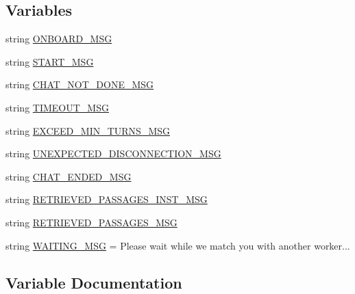 \subsection*{Variables}
\begin{DoxyCompactItemize}
\item 
string \hyperlink{namespacepersonachat__eval_1_1worlds_abc88de34626a01543ac942d5fce1efa5}{O\+N\+B\+O\+A\+R\+D\+\_\+\+M\+SG}
\item 
string \hyperlink{namespacepersonachat__eval_1_1worlds_ad32547472d0fc805d4fea6848b2bb998}{S\+T\+A\+R\+T\+\_\+\+M\+SG}
\item 
string \hyperlink{namespacepersonachat__eval_1_1worlds_accdb0ecc5e13a680dd0a04bc50ec58f4}{C\+H\+A\+T\+\_\+\+N\+O\+T\+\_\+\+D\+O\+N\+E\+\_\+\+M\+SG}
\item 
string \hyperlink{namespacepersonachat__eval_1_1worlds_aebdfc7aa4e7d13041838bf4740af68e9}{T\+I\+M\+E\+O\+U\+T\+\_\+\+M\+SG}
\item 
string \hyperlink{namespacepersonachat__eval_1_1worlds_af63617f0fcf4de824e966b5707d890bb}{E\+X\+C\+E\+E\+D\+\_\+\+M\+I\+N\+\_\+\+T\+U\+R\+N\+S\+\_\+\+M\+SG}
\item 
string \hyperlink{namespacepersonachat__eval_1_1worlds_ad28f2b18e12e7f7c40cd1e74a70ed2f3}{U\+N\+E\+X\+P\+E\+C\+T\+E\+D\+\_\+\+D\+I\+S\+C\+O\+N\+N\+E\+C\+T\+I\+O\+N\+\_\+\+M\+SG}
\item 
string \hyperlink{namespacepersonachat__eval_1_1worlds_aa7bd7fa272fd051e763dd472593ca0de}{C\+H\+A\+T\+\_\+\+E\+N\+D\+E\+D\+\_\+\+M\+SG}
\item 
string \hyperlink{namespacepersonachat__eval_1_1worlds_aa17c7b4ff4b1d411001d4947c1caa475}{R\+E\+T\+R\+I\+E\+V\+E\+D\+\_\+\+P\+A\+S\+S\+A\+G\+E\+S\+\_\+\+I\+N\+S\+T\+\_\+\+M\+SG}
\item 
string \hyperlink{namespacepersonachat__eval_1_1worlds_a7eb556aa221cba58925ddfa62192fbb7}{R\+E\+T\+R\+I\+E\+V\+E\+D\+\_\+\+P\+A\+S\+S\+A\+G\+E\+S\+\_\+\+M\+SG}
\item 
string \hyperlink{namespacepersonachat__eval_1_1worlds_aec42d3ce476692138479aa9ea2c953a1}{W\+A\+I\+T\+I\+N\+G\+\_\+\+M\+SG} = \textquotesingle{}Please wait while we match you with another worker...\textquotesingle{}
\end{DoxyCompactItemize}


\subsection{Variable Documentation}
\mbox{\label{namespacepersonachat__eval_1_1worlds_aa7bd7fa272fd051e763dd472593ca0de}} 
